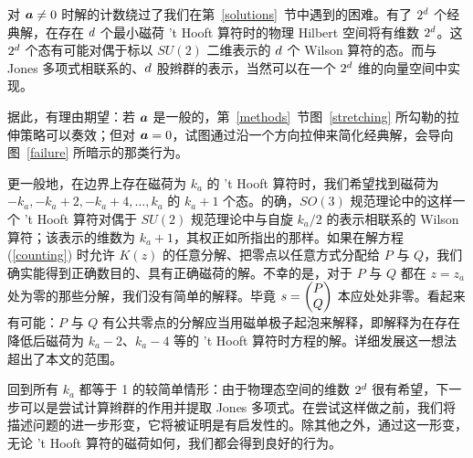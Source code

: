 对 $\ca\not=0$ 时解的计数绕过了我们在第~\ref{solutions}~节中遇到的困难。有了 $2^\ss$ 个经典解，在存在 $\ss$ 个最小磁荷 't Hooft 算符时的物理 Hilbert 空间将有维数 $2^\ss$。这 $2^\ss$ 个态有可能对偶于标以 $SU(2)$ 二维表示的 $\ss$ 个 Wilson 算符的态。而与 Jones 多项式相联系的、$\ss$ 股辫群的表示，当然可以在一个 $2^\ss$ 维的向量空间中实现。

据此，有理由期望：若 $\ca$ 是一般的，第~\ref{methods}~节图~\ref{stretching} 所勾勒的拉伸策略可以奏效；但对 $\ca=0$，试图通过沿一个方向拉伸来简化经典解，会导向图~\ref{failure} 所暗示的那类行为。

更一般地，在边界上存在磁荷为 $k_a$ 的 't Hooft 算符时，我们希望找到磁荷为 $-k_a,-k_a+2,-k_a+4,\dots,k_a$ 的 $k_a+1$ 个态。的确，$SO(3)$ 规范理论中的这样一个 't Hooft 算符对偶于 $SU(2)$ 规范理论中与自旋 $k_a/2$ 的表示相联系的 Wilson 算符；该表示的维数为 $k_a+1$，其权正如所指出的那样。如果在解方程 (\ref{counting}) 时允许 $K(z)$ 的任意分解、把零点以任意方式分配给 $P$ 与 $Q$，我们确实能得到正确数目的、具有正确磁荷的解。不幸的是，对于 $P$ 与 $Q$ 都在 $z=z_a$ 处为零的那些分解，我们没有简单的解释。毕竟 $s=\begin{pmatrix}P \cr Q\end{pmatrix}$ 本应处处非零。看起来有可能：$P$ 与 $Q$ 有公共零点的分解应当用磁单极子起泡来解释，即解释为在存在降低后磁荷为 $k_a-2$、$k_a-4$ 等的 't Hooft 算符时方程的解。详细发展这一想法超出了本文的范围。

回到所有 $k_a$ 都等于 1 的较简单情形：由于物理态空间的维数 $2^\ss$ 很有希望，下一步可以是尝试计算辫群的作用并提取 Jones 多项式。在尝试这样做之前，我们将描述问题的进一步形变，它将被证明是有启发性的。除其他之外，通过这一形变，无论 't Hooft 算符的磁荷如何，我们都会得到良好的行为。
